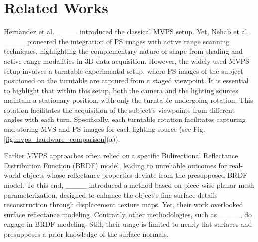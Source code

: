\section{Related Works}
\label{sec:relatedworks}
Hern${\acute{\text{a}}}$ndez et al. ____ introduced the classical MVPS setup. Yet, Nehab et al. ____ pioneered the integration of PS images with active range scanning techniques, highlighting the complementary nature of shape from shading and active range modalities in 3D data acquisition. However, the widely used MVPS setup involves a turntable experimental setup, where PS images of the subject positioned on the turntable are captured from a staged viewpoint. It is essential to highlight that within this setup, both the camera and the lighting sources maintain a stationary position, with only the turntable undergoing rotation. This rotation facilitates the acquisition of the subject's viewpoints from different angles with each turn. Specifically, each turntable rotation facilitates capturing and storing MVS and PS images for each lighting source (see Fig.\ref{fig:mvps_hardware_comparison}(a)). 

\vspace{-0.3cm}
Earlier MVPS approaches often relied on a specific Bidirectional Reflectance Distribution Function (BRDF) model, leading to unreliable outcomes for real-world objects whose reflectance properties deviate from the presupposed BRDF model. To this end, ____ introduced a method based on piece-wise planar mesh parameterization, designed to enhance the object's fine surface details reconstruction through displacement texture maps. Yet, their work overlooked surface reflectance modeling. Contrarily, other methodologies, such as ____, do engage in BRDF modeling. Still, their usage is limited to nearly flat surfaces and presupposes a prior knowledge of the surface normals.

